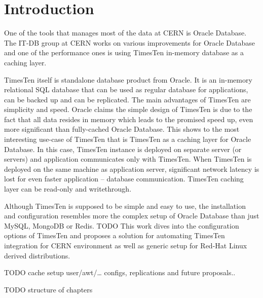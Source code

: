 \documentclass[11pt, letterpaper]{article}
\newcommand{\footrulecolor}[1]{\patchcmd{\footrule}{\hrule}{\color{#1}\hrule}{}{}}\fancyhead{} %
\begin{document}
{\fontsize{11}{13}\sffamily\linespread{1.750}\selectfont\tableofcontents}
\thispagestyle{fancy}\newpage

\fancyfoot{} %
\renewcommand{\footrulewidth}{0.4pt} %
\footrulecolor{linec}


\section{Introduction}
One of the tools that manages most of the data at CERN is Oracle Database. The IT-DB group at CERN works on various improvements for Oracle Database and one of the performance ones is using TimesTen in-memory database as a caching layer.
\par
TimesTen itself is standalone database product from Oracle. It is an in-memory relational SQL database that can be used as regular database for applications, can be backed up and can be replicated. The main advantages of TimesTen are simplicity and speed. Oracle claims the simple design of TimesTen is due to the fact that all data resides in memory which leads to the promised speed up, even more significant than fully-cached Oracle Database. This shows to the most interesting use-case of TimesTen that is TimesTen as a caching layer for Oracle Database. In this case, TimesTen instance is deployed on separate server (or servers) and application communicates only with TimesTen. When TimesTen is deployed on the same machine as application server, significant network latency is lost for even faster application – database communication. TimesTen caching layer can be read-only and writethrough.

Although TimesTen is supposed to be simple and easy to use, the installation and configuration resembles more the complex setup of Oracle Database than just MySQL, MongoDB or Redis. TODO This work dives into the configuration options of TimesTen and proposes a solution for automating TimesTen integration for CERN environment as well as generic setup for Red-Hat Linux derived distributions.

TODO cache setup user/awt/… configs, replications and future proposals..

TODO structure of chapters
\end{document}
